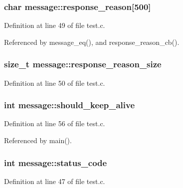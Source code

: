 \subsubsection[{response\+\_\+reason}]{\setlength{\rightskip}{0pt plus 5cm}char message\+::response\+\_\+reason[500]}\label{structmessage_a5e1f7c4f89b4f1be724da27dae96cf67}


Definition at line 49 of file test.\+c.



Referenced by message\+\_\+eq(), and response\+\_\+reason\+\_\+cb().

\subsubsection[{response\+\_\+reason\+\_\+size}]{\setlength{\rightskip}{0pt plus 5cm}size\+\_\+t message\+::response\+\_\+reason\+\_\+size}\label{structmessage_a890e5c360d7bc365cfbd962da290c332}


Definition at line 50 of file test.\+c.

\subsubsection[{should\+\_\+keep\+\_\+alive}]{\setlength{\rightskip}{0pt plus 5cm}int message\+::should\+\_\+keep\+\_\+alive}\label{structmessage_a9fa2fe019b9b15109632ba49448125b2}


Definition at line 56 of file test.\+c.



Referenced by main().

\subsubsection[{status\+\_\+code}]{\setlength{\rightskip}{0pt plus 5cm}int message\+::status\+\_\+code}\label{structmessage_a99bc02df92f50d348a9b64a3b64ddd12}


Definition at line 47 of file test.\+c.



